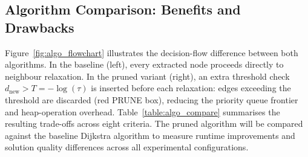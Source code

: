 \subsection{Algorithm Comparison: Benefits and Drawbacks}
\label{sec:algocomparison}

Figure~\ref{fig:algo_flowchart} illustrates the decision-flow difference between both algorithms. In the baseline (left), every extracted node proceeds directly to neighbour relaxation. In the pruned variant (right), an extra threshold check $d_{\text{new}}>T=-\log(\tau)$ is inserted before each relaxation: edges exceeding the threshold are discarded (red PRUNE box), reducing the priority queue frontier and heap-operation overhead. Table~\ref{table:algo_compare} summarises the resulting trade-offs across eight criteria. The pruned algorithm will be compared against the baseline Dijkstra algorithm to measure runtime improvements and solution quality differences across all experimental configurations.

